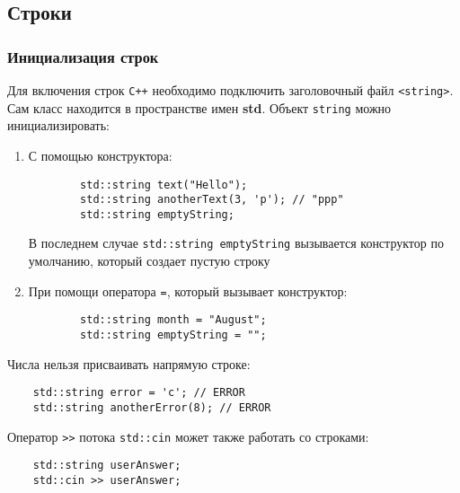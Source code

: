 \subsection{Строки}
\subsubsection{Инициализация строк}
Для включения строк \texttt{C++} необходимо подключить заголовочный файл \lstinline|<string>|. Сам класс находится в пространстве имен \textbf{std}. Объект \lstinline|string| можно инициализировать:

\begin{enumerate}
    \item С помощью конструктора:
    \begin{lstlisting}
        std::string text("Hello");
        std::string anotherText(3, 'p'); // "ppp"
        std::string emptyString;
    \end{lstlisting}

    В последнем случае \lstinline|std::string emptyString| вызывается конструктор по умолчанию, который создает пустую строку
    \item При помощи оператора \lstinline{=}, который вызывает конструктор:
    \begin{lstlisting}
        std::string month = "August";
        std::string emptyString = "";
    \end{lstlisting}
\end{enumerate}

Числа нельзя присваивать напрямую строке:
\begin{lstlisting}
    std::string error = 'c'; // ERROR
    std::string anotherError(8); // ERROR
\end{lstlisting}

Оператор \lstinline|>>| потока \lstinline|std::cin| может также работать со строками:
\begin{lstlisting}
    std::string userAnswer;
    std::cin >> userAnswer;
\end{lstlisting}

